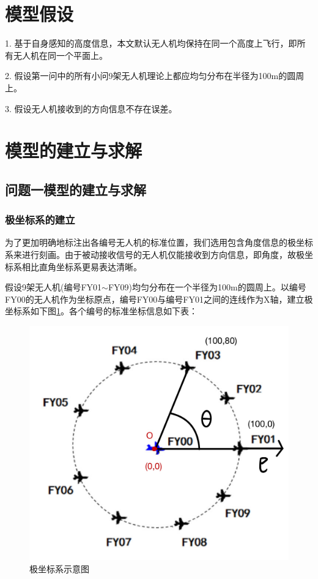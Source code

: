 \documentclass{ctexart}
\begin{document}
\section{模型假设}
1. \quad 基于自身感知的高度信息，本文默认无人机均保持在同一个高度上飞行，即所有无人机在同一个平面上。

2. \quad 假设第一问中的所有小问9架无人机理论上都应均匀分布在半径为100m的圆周上。

3. \quad 假设无人机接收到的方向信息不存在误差。

\section{模型的建立与求解}

\subsection{问题一模型的建立与求解}

\subsubsection{极坐标系的建立}

为了更加明确地标注出各编号无人机的标准位置，我们选用包含角度信息的极坐标系来进行刻画。由于被动接收信号的无人机仅能接收到方向信息，即角度，故极坐标系相比直角坐标系更易表达清晰。

假设9架无人机(编号FY01$\sim$FY09)均匀分布在一个半径为100m的圆周上。以编号FY00的无人机作为坐标原点，编号FY00与编号FY01之间的连线作为X轴，建立极坐标系如下图\ref{极坐标系示意图}。各个编号的标准坐标信息如下表：

\begin{figure}[H]
  \centering
  \includegraphics[width=0.40\linewidth]{pic/极坐标.jpg}
  \caption{极坐标系示意图}
  \label{极坐标系示意图}
  \end{figure} 
\end{document}
